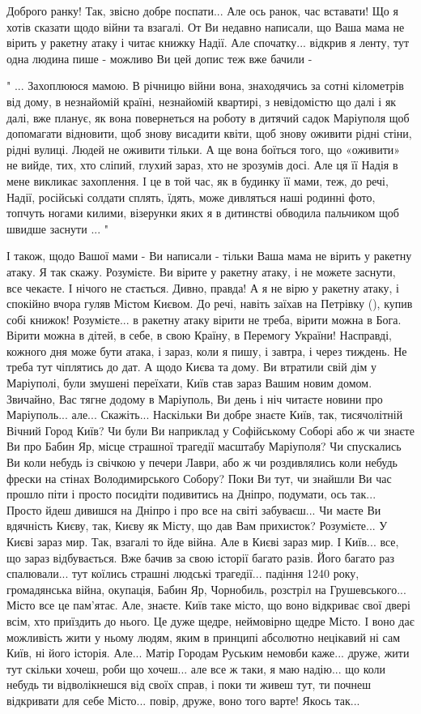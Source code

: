 Доброго ранку! Так, звісно добре поспати... Але ось ранок, час вставати!  Що я
хотів сказати щодо війни та взагалі. От Ви недавно написали, що Ваша мама не
вірить у ракетну атаку і читає книжку Надії. Але спочатку... відкрив я ленту,
тут одна людина пише - можливо Ви цей допис теж вже бачили -

" ... Захоплююся мамою. В річницю війни вона, знаходячись за сотні кілометрів від
дому, в незнайомій країні, незнайомій квартирі, з невідомістю що далі і як
далі, вже планує, як вона повернеться на роботу в дитячий садок Маріуполя щоб
допомагати відновити, щоб знову висадити квіти, щоб знову оживити рідні стіни,
рідні вулиці. Людей не оживити тільки.  А ще вона боїться того, що «оживити» не
вийде, тих, хто сліпий, глухий зараз, хто не зрозумів досі. Але ця її Надія в
мене викликає захоплення. І це в той час, як в будинку її мами, теж, до речі,
Надії, російські солдати сплять, їдять, може дивляться наші родинні фото,
топчуть ногами килими, візерунки яких я в дитинстві обводила пальчиком щоб
швидше заснути ... "

І також, щодо Вашої мами - Ви написали - тільки Ваша мама не вірить у ракетну
атаку. Я так скажу.  Розумієте. Ви вірите у ракетну атаку, і не можете заснути,
все чекаєте. І нічого не стається. Дивно, правда!  А я не вірю у ракетну атаку,
і спокійно вчора гуляв Містом Києвом. До речі, навіть заїхав на Петрівку (),
купив собі книжок!  Розумієте... в ракетну атаку вірити не треба, вірити можна
в Бога. Вірити можна в дітей, в себе, в свою Країну, в Перемогу України!
Насправді, кожного дня може бути атака, і зараз, коли я пишу, і завтра, і через
тиждень.  Не треба тут чіплятись до дат. А щодо Києва та дому. Ви втратили свій
дім у Маріуполі, були змушені переїхати, Київ став зараз Вашим новим домом.
Звичайно, Вас тягне додому в Маріуполь, Ви день і ніч читаєте новини про
Маріуполь... але... Скажіть...  Наскільки Ви добре знаєте Київ, так,
тисячолітній Вічний Город Київ? Чи були Ви наприклад у Софійському Соборі або ж
чи знаєте Ви про Бабин Яр, місце страшної трагедії масштабу Маріуполя? Чи
спускались Ви коли небудь із свічкою у печери Лаври, або ж чи роздивлялись коли
небудь фрески на стінах Володимирського Собору? Поки Ви тут, чи знайшли Ви час
прошло піти і просто посидіти подивитись на Дніпро, подумати, ось так... Просто
йдеш дивишся на Дніпро і про все на світі забуваєш...  Чи маєте Ви вдячність
Києву, так, Києву як Місту, що дав Вам прихисток? Розумієте... У Києві зараз
мир. Так, взагалі то йде війна.  Але в Києві зараз мир. І Київ...  все, що
зараз відбувається. Вже бачив за свою історії багато разів.  Його багато раз
спалювали... тут коїлись страшні людські трагедії... падіння 1240 року,
громадянська війна, окупація, Бабин Яр, Чорнобиль, розстріл на Грушевського...
Місто все це пам'ятає. Але, знаєте. Київ таке місто, що воно відкриває свої
двері всім, хто приїздить до нього. Це дуже щедре, неймовірно щедре Місто. І
воно дає можливість жити у ньому людям, яким в принципі абсолютно нецікавий ні
сам Київ, ні його історія. Але... Матір Городам Руським немовби каже... друже,
жити тут скільки хочеш, роби що хочеш... але все ж таки, я маю надію...  що
коли небудь ти відволікнешся від своїх справ, і поки ти живеш тут, ти почнеш
відкривати для себе Місто... повір, друже, воно того варте! Якось так...

